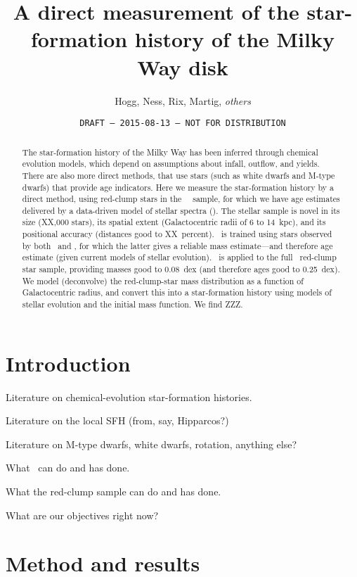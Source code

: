 \documentclass[12pt, preprint]{aastex}
\begin{document}
\title{A direct measurement of the star-formation history of the Milky Way disk}
\author{%
  Hogg,
  Ness,
  Rix,
  Martig,
  \emph{others}}
\date{\texttt{DRAFT --- 2015-08-13 --- NOT FOR DISTRIBUTION}}

\begin{abstract}
The star-formation history of the Milky Way has been inferred
through chemical evolution models, which depend on assumptions about
infall, outflow, and yields.
There are also more direct methods, that use stars (such as white
dwarfs and M-type dwarfs) that provide age indicators.
Here we measure the star-formation history by a direct method, using
red-clump stars in the \sdss\ \apogee\ sample, for which we have age
estimates delivered by a data-driven model of stellar spectra (\tc).
The stellar sample is novel in its size (XX,000 stars), its spatial
extent (Galactocentric radii of 6 to 14~kpc), and its positional
accuracy (distances good to XX~percent).
\tc\ is trained using stars observed by both \apogee\ and \kepler, for
which the latter gives a reliable mass estimate---and therefore age
estimate (given current models of stellar evolution).
\tc\ is applied to the full \apogee\ red-clump star sample, providing
masses good to 0.08~dex (and therefore ages good to 0.25~dex).
We model (deconvolve) the red-clump-star mass distribution as a function
of Galactocentric radius, and convert this into a star-formation history
using models of stellar evolution and the initial mass function.
We find ZZZ.
\end{abstract}

\section{Introduction}

Literature on chemical-evolution star-formation histories.

Literature on the local SFH (from, say, Hipparcos?)

Literature on M-type dwarfs, white dwarfs, rotation, anything else?

What \tc\ can do and has done.

What the red-clump sample can do and has done.

What are our objectives right now?

\section{Method and results}
\end{document}
